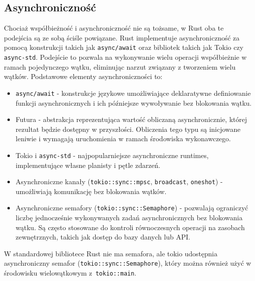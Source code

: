 \subsection{Asynchroniczność}
Chociaż współbieżność i asynchroniczność nie są tożsame, w Rust oba te podejścia są ze sobą ściśle powiązane. Rust implementuje asynchroniczność za pomocą konstrukcji takich jak \texttt{async/await} oraz bibliotek takich jak Tokio czy \texttt{async-std}. Podejście to pozwala na wykonywanie wielu operacji współbieżnie w ramach pojedynczego wątku, eliminując narzut związany z tworzeniem wielu wątków.
Podstawowe elementy asynchroniczności to:
\begin{itemize}
    \item \texttt{async/await} - konstrukcje językowe umożliwiające deklaratywne definiowanie funkcji asynchronicznych i ich późniejsze wywoływanie bez blokowania wątku.
    \item Futura - abstrakcja reprezentująca wartość obliczaną asynchronicznie, której rezultat będzie dostępny w przyszłości. Obliczenia tego typu są inicjowane leniwie i wymagają uruchomienia w ramach środowiska wykonawczego.
    \item Tokio i \texttt{async-std} - najpopularniejsze asynchroniczne runtimes, implementujące własne planisty i pętle zdarzeń.
    \item Asynchroniczne kanały (\texttt{tokio::sync::mpsc}, \texttt{broadcast}, \texttt{oneshot}) - umożliwiają komunikację bez blokowania wątków.
    \item Asynchroniczne semafory (\texttt{tokio::sync::Semaphore}) - pozwalają ograniczyć liczbę jednocześnie wykonywanych zadań asynchronicznych bez blokowania wątku. Są często stosowane do kontroli równoczesnych operacji na zasobach zewnętrznych, takich jak dostęp do bazy danych lub API.
\end{itemize}
W standardowej bibliotece Rust nie ma semafora, ale tokio udostępnia asynchroniczny semafor (\texttt{tokio::sync::Semaphore}), który można również użyć w środowisku wielowątkowym z~\texttt{tokio::main}.

